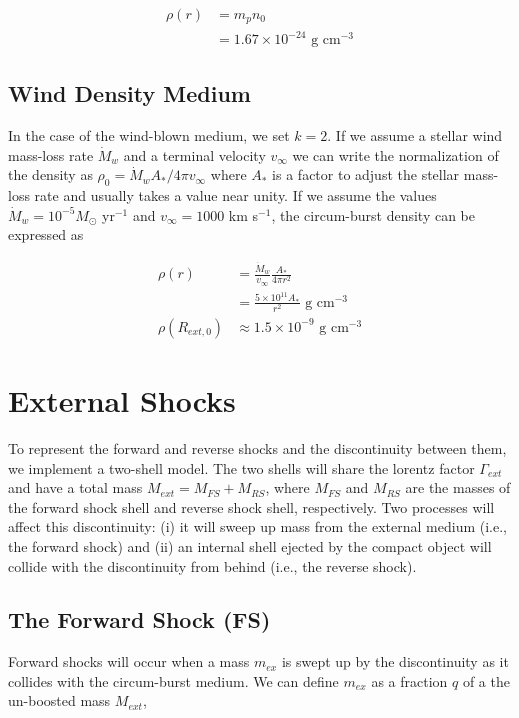 \documentclass[linenumbers,twocolumn]{aastex631}
\begin{document}
\begin{align}
	\rho(r) &= m_pn_0\\
	&= 1.67\times10^{-24} \text{ g cm}^{-3}
\end{align}

\subsection{Wind Density Medium}

In the case of the wind-blown medium, we set $k=2$. If we assume a stellar wind mass-loss rate $\dot{M}_w$ and a terminal velocity $v_{\infty}$ we can write the normalization of the density as $\rho_{0} =  \dot{M}_w A_{*} / 4\pi v_{\infty}$ where $A_{*}$ is a factor to adjust the stellar mass-loss rate and usually takes a value near unity. If we assume the values $\dot{M}_w = 10^{-5} M_{\odot}$ yr$^{-1}$ and $v_{\infty} = 1000$ km s$^{-1}$, the circum-burst density can be expressed as

\begin{align}
	\rho(r) &= \frac{\dot{M}_{w}}{v_{\infty}}\frac{A_{*}}{4\pi r^2}\\
	&= \frac{5\times10^{11} A_{*}}{r^2} \text{ g cm}^{-3} \\
	\rho(R_{ext,0}) &\approx 1.5\times10^{-9}\text{ g cm}^{-3}
\end{align}

\section{External Shocks}

To represent the forward and reverse shocks and the discontinuity between them, we implement a two-shell model. The two shells will share the lorentz factor $\Gamma_{ext}$ and have a total mass $M_{ext} = M_{FS} + M_{RS}$, where $M_{FS}$ and $M_{RS}$ are the masses of the forward shock shell and reverse shock shell, respectively. Two processes will affect this discontinuity: (i) it will sweep up mass from the external medium (i.e., the forward shock) and (ii) an internal shell ejected by the compact object will collide with the discontinuity from behind (i.e., the reverse shock).

\subsection{The Forward Shock (FS)}

Forward shocks will occur when a mass $m_{ex}$ is swept up by the discontinuity as it collides with the circum-burst medium. We can define $m_{ex}$ as a fraction $q$ of a the un-boosted mass $M_{ext}$, 
\end{document}
